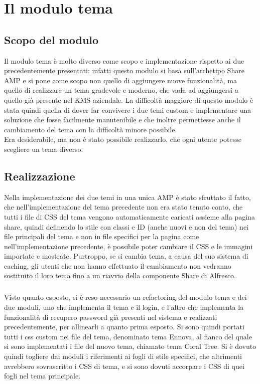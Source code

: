 
\chapter{Il modulo tema}
\label{cap:modulo-tema}

\section{Scopo del modulo}
Il modulo tema è molto diverso come scopo e implementazione rispetto ai due precedentemente presentati: infatti questo modulo si basa sull'archetipo Share AMP e si pone come scopo non quello di aggiungere nuove funzionalità, ma quello di realizzare un tema gradevole e moderno, che vada ad aggiungersi a quello già presente nel KMS aziendale. La difficoltà maggiore di questo modulo è stata quindi quella di dover far convivere i due temi custom e implementare una soluzione che fosse facilmente manutenibile e che inoltre permettesse anche il cambiamento del tema con la difficoltà minore possibile.\\
Era desiderabile, ma non è stato possibile realizzarlo, che ogni utente potesse scegliere un tema diverso.
\section{Realizzazione}
Nella implementazione dei due temi in una unica AMP è stato sfruttato il fatto, che nell'implementazione del tema precedente non era stato tenuto conto, che tutti i file di CSS del tema vengono automaticamente caricati assieme alla pagina share, quindi definendo lo stile con classi e ID (anche nuovi e non del tema) nei file principali del tema e non in file specifici per la pagina come nell'implementazione precedente, è possibile poter cambiare il CSS e le immagini importate e mostrate.
Purtroppo, se si cambia tema, a causa del suo sistema di caching, gli utenti che non hanno effettuato il cambiamento non vedranno sostituito il loro tema fino a un riavvio della componente Share di Alfresco.
\paragraph{}Visto quanto esposto, si è reso necessario un refactoring del modulo tema e dei due moduli, uno che implementa il tema e il login, e l'altro che implementa la funzionalità di recupero password già presenti nel sistema e realizzati precedentemente, per allinearli a quanto prima esposto. Si sono quindi portati tutti i css custom nei file del tema, denominato tema Ennova, al fianco del quale si sono implementati i file del nuovo tema, chiamato tema Coral Tree. Si è dovuto quindi togliere dai moduli i riferimenti ai fogli di stile specifici, che altrimenti avrebbero sovrascritto i CSS di tema, e si sono dovuti accorpare i CSS di quei fogli nel tema principale.
